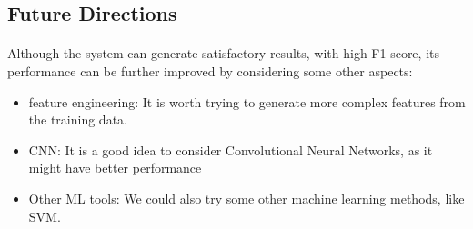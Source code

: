 \documentclass[fleqn,11pt]{olplainarticle}
\begin{document}
\subsection{Future Directions}\label{future}
\paragraph*{}
Although the system can generate satisfactory results, with high F1 score, its performance can be further improved by considering some other aspects:
\begin{itemize}
\item feature engineering: It is worth trying to generate more complex features from the training data.
\item CNN: It is a good idea to consider Convolutional Neural Networks, as it might have better performance
\item Other ML tools: We could also try some other machine learning methods, like SVM.
\end{itemize}




\end{document}
